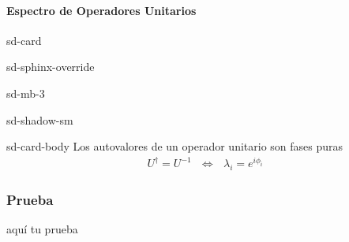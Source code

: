 \documentclass[letterpaper,10pt,english]{jupyterBook}
\begin{document}
\paragraph{Espectro de Operadores Unitarios}
\label{\detokenize{docs/Part_01_Formalismo/Chapter_01_02_Formalismo_matem_xe1tico/01_03_Operadores_myst:espectro-de-operadores-unitarios}}
\begin{sphinxuseclass}{sd-card}
\begin{sphinxuseclass}{sd-sphinx-override}
\begin{sphinxuseclass}{sd-mb-3}
\begin{sphinxuseclass}{sd-shadow-sm}
\begin{sphinxuseclass}{sd-card-body}
\sphinxAtStartPar
Los autovalores de un operador unitario son fases puras
\begin{equation*}
\begin{split}
U^\dagger = U^{-1} ~~~\Longleftrightarrow ~~~\lambda_i = e^{i\phi_i}
\end{split}
\end{equation*}
\end{sphinxuseclass}
\end{sphinxuseclass}
\end{sphinxuseclass}
\end{sphinxuseclass}
\end{sphinxuseclass}\subsubsection*{Prueba}

\sphinxAtStartPar
aquí tu prueba
\end{document}
